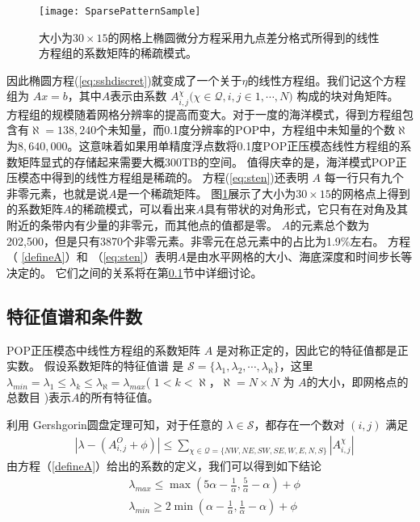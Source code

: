 \begin{figure}
\centering
\texttt{[image: SparsePatternSample]}
\caption[] {大小为$30\times 15$的网格上椭圆微分方程采用九点差分格式所得到的线性方程组的系数矩阵的稀疏模式。 \label{fig:spy}}
\end{figure}
因此椭圆方程(\ref{eq:sshdiscret})就变成了一个关于$\eta$的线性方程组。我们记这个方程组为 $Ax= b$，其中$A$表示由系数 $A_{i,j}^{\chi } ( \chi \in \mathcal{Q}, i,j \in {1,\cdots, N)}$ 构成的块对角矩阵。
方程组的规模随着网格分辨率的提高而变大。对于一度的海洋模式，得到方程组包含有$\aleph = 138,240$个未知量，而0.1度分辨率的POP中，方程组中未知量的个数$\aleph$ 为$8,640,000$。这意味着如果用单精度浮点数将0.1度POP正压模态线性方程组的系数矩阵显式的存储起来需要大概300TB的空间。
值得庆幸的是，海洋模式POP正压模态中得到的线性方程组是稀疏的。
方程(\ref{eq:sten})还表明 $A$ 每一行只有九个非零元素，也就是说$A$是一个稀疏矩阵。 图\ref{fig:spy}展示了大小为$30\times 15$的网格点上得到的系数矩阵$A$的稀疏模式，可以看出来$A$具有带状的对角形式，它只有在对角及其附近的条带内有少量的非零元，而其他点的值都是零。
$A$的元素总个数为202,500，但是只有3870个非零元素。非零元在总元素中的占比为1.9\%左右。
方程（ \ref{defineA}）和 （\ref{eq:sten}）表明$A$是由水平网格的大小、海底深度和时间步长等决定的。
它们之间的关系将在第\ref{solver:Algorithm:condition}节中详细讨论。

\subsection{特征值谱和条件数}
\label{solver:Algorithm:condition}

POP正压模态中线性方程组的系数矩阵 $A$ 是对称正定的\cite{smith2010parallel}，因此它的特征值都是正实数\cite{stewart1976positive}。
假设系数矩阵的特征值谱\cite{golub2012matrix} 是 $\mathcal{S} = \{\lambda_1, \lambda_2, \cdots, \lambda_\aleph\}$，这里 $\lambda_{min} = \lambda_1 \le \lambda_k \le \lambda_\aleph = \lambda_{max}$( $1<k <\aleph $，$\aleph=N\times N$ 为 $A$的大小，即网格点的总数目 )表示$A$的所有特征值。

利用 Gershgorin圆盘定理\cite{bell1965gershgorin}可知，对于任意的 $\lambda \in \mathcal{S}$，都存在一个数对 $(i,j)$ 满足
\begin{align}
&|\lambda -  (A_{i,j}^O + \phi ) | \le \sum_{\chi \in \mathcal{Q} = \{NW,NE,SW,SE,W,E,N,S\}}|A_{i,j}^\chi|
\end{align}
由方程（\ref{defineA}）给出的系数的定义，我们可以得到如下结论 
\begin{align} \label{eigsGersh}
&\lambda_{max} \le  \max (  5\alpha - \frac{1}{\alpha}, \frac{5}{\alpha}- \alpha) +\phi   \\
&\lambda_{min} \ge 2\min (  \alpha - \frac{1}{\alpha},\frac{1} {\alpha} -  \alpha) + \phi
\end{align}

